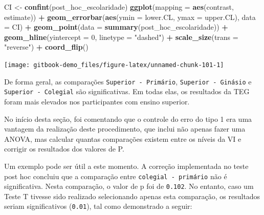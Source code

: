 \documentclass[
]{book}
\newenvironment{Shaded}{\begin{snugshade}}{\end{snugshade}}
\newcommand{\DataTypeTok}[1]{\textcolor[rgb]{0.13,0.29,0.53}{#1}}
\newcommand{\DecValTok}[1]{\textcolor[rgb]{0.00,0.00,0.81}{#1}}
\newcommand{\KeywordTok}[1]{\textcolor[rgb]{0.13,0.29,0.53}{\textbf{#1}}}
\newcommand{\NormalTok}[1]{#1}
\newcommand{\OperatorTok}[1]{\textcolor[rgb]{0.81,0.36,0.00}{\textbf{#1}}}
\newcommand{\StringTok}[1]{\textcolor[rgb]{0.31,0.60,0.02}{#1}}
\begin{document}
\begin{Shaded}
\begin{Highlighting}[]
\NormalTok{CI <-}\StringTok{ }\KeywordTok{confint}\NormalTok{(post_hoc_escolaridade)}
\KeywordTok{ggplot}\NormalTok{(}\DataTypeTok{mapping =} \KeywordTok{aes}\NormalTok{(contrast, estimate)) }\OperatorTok{+}
\StringTok{  }\KeywordTok{geom_errorbar}\NormalTok{(}\KeywordTok{aes}\NormalTok{(}\DataTypeTok{ymin =}\NormalTok{ lower.CL, }\DataTypeTok{ymax =}\NormalTok{ upper.CL), }\DataTypeTok{data =}\NormalTok{ CI) }\OperatorTok{+}
\StringTok{  }\KeywordTok{geom_point}\NormalTok{(}\DataTypeTok{data =} \KeywordTok{summary}\NormalTok{(post_hoc_escolaridade)) }\OperatorTok{+}
\StringTok{  }\KeywordTok{geom_hline}\NormalTok{(}\DataTypeTok{yintercept =} \DecValTok{0}\NormalTok{, }\DataTypeTok{linetype =} \StringTok{"dashed"}\NormalTok{) }\OperatorTok{+}\StringTok{ }
\StringTok{  }\KeywordTok{scale_size}\NormalTok{(}\DataTypeTok{trans =} \StringTok{"reverse"}\NormalTok{) }\OperatorTok{+}\StringTok{ }
\StringTok{  }\KeywordTok{coord_flip}\NormalTok{()}
\end{Highlighting}
\end{Shaded}

\begin{center}\texttt{[image: gitbook-demo\_files/figure-latex/unnamed-chunk-101-1]} \end{center}

De forma geral, as comparações \texttt{Superior\ -\ Primário},
\texttt{Superior\ -\ Ginásio} e \texttt{Superior\ -\ Colegial} são
significativas. Em todas elas, os resultados da TEG foram mais elevados
nos participantes com ensino superior.

No início desta seção, foi comentando que o controle do erro do tipo 1
era uma vantagem da realização deste procedimento, que inclui não apenas
fazer uma ANOVA, mas calcular quantas comparações existem entre os
níveis da VI e corrigir os resultados dos valores de P.

Um exemplo pode ser útil a este momento. A correção implementada no
teste post hoc concluiu que a comparação entre
\texttt{colegial\ -\ primário} não é significativa. Nesta comparação, o
valor de p foi de \texttt{0.102}. No entanto, caso um Teste T tivesse
sido realizado selecionando apenas esta comparação, os resultados seriam
significativos (\texttt{0.01}), tal como demonstrado a seguir:

\begin{Shaded}
\end{Shaded}
\end{document}
